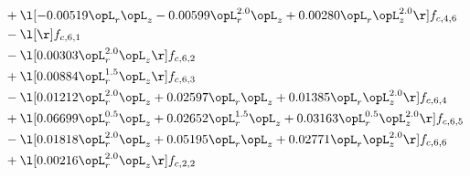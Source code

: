 \begin{alignat}{2}
& + \l[  -0.00519 \opL_r \opL_z   -0.00599 \opL_r^{2.0} \opL_z +  0.00280 \opL_r \opL_z^{2.0}  \r] f_{c,4,6} \nonumber \\ 
& - \l[  \r] f_{c,6,1} \nonumber \\ 
& - \l[  0.00303 \opL_r^{2.0} \opL_z  \r] f_{c,6,2} \nonumber \\ 
& + \l[  0.00884 \opL_r^{1.5} \opL_z  \r] f_{c,6,3} \nonumber \\ 
& - \l[  0.01212 \opL_r^{2.0} \opL_z +  0.02597 \opL_r \opL_z +  0.01385 \opL_r \opL_z^{2.0}  \r] f_{c,6,4} \nonumber \\ 
& + \l[  0.06699 \opL_r^{0.5} \opL_z +  0.02652 \opL_r^{1.5} \opL_z +  0.03163 \opL_r^{0.5} \opL_z^{2.0}  \r] f_{c,6,5} \nonumber \\ 
& - \l[  0.01818 \opL_r^{2.0} \opL_z +  0.05195 \opL_r \opL_z +  0.02771 \opL_r \opL_z^{2.0}  \r] f_{c,6,6} \nonumber \\ 
& + \l[  0.00216 \opL_r^{2.0} \opL_z  \r] f_{c,2,2} \nonumber \\ 
\end{alignat} 


